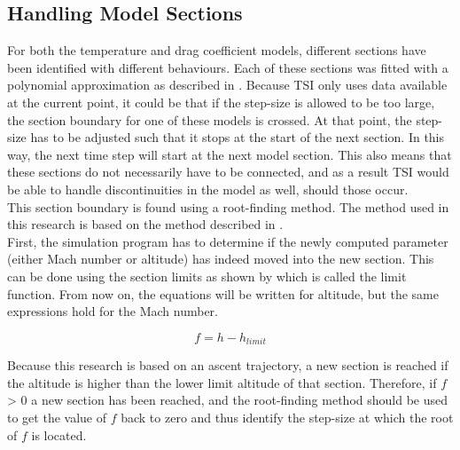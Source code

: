 \subsection{Handling Model Sections}
\label{subsec:handlingModelSections}
For both the temperature and drag coefficient models, different sections have been identified with different behaviours. Each of these sections was fitted with a polynomial approximation as described in . Because \ac{TSI} only uses data available at the current point, it could be that if the step-size is allowed to be too large, the section boundary for one of these models is crossed. At that point, the step-size has to be adjusted such that it stops at the start of the next section. In this way, the next time step will start at the next model section. This also means that these sections do not necessarily have to be connected, and as a result \ac{TSI} would be able to handle discontinuities in the model as well, should those occur. \\
This section boundary is found using a root-finding method. The method used in this research is based on the method described in \cite{bergsma2015application}. \\

\noindent
First, the simulation program has to determine if the newly computed parameter (either Mach number or altitude) has indeed moved into the new section. This can be done using the section limits as shown by  which is called the limit function. From now on, the equations will be written for altitude, but the same expressions hold for the Mach number.

\begin{equation} \label{eq:limitFunction}
f = h-h_{limit}
\end{equation}


\noindent
Because this research is based on an ascent trajectory, a new section is reached if the altitude is higher than the lower limit altitude of that section. Therefore, if $f$ > 0 a new section has been reached, and the root-finding method should be used to get the value of $f$ back to zero and thus identify the step-size at which the root of $f$ is located.\\

